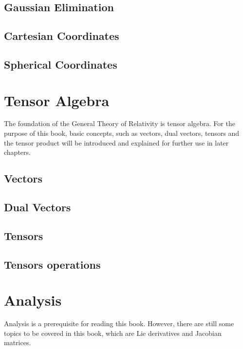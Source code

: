 \subsection{Gaussian Elimination}
\label{subsec:gaussian-elimination}

\subsection{Cartesian Coordinates}
\label{subsec:cartesian}

\subsection{Spherical Coordinates}
\label{subsec:spherical-coordinates}

\section{Tensor Algebra}
\label{sec:tensor-algebra}

The foundation of the General Theory of Relativity is tensor algebra.
For the purpose of this book, basic concepts, such as vectors, dual vectors, tensors and the tensor product will be introduced and explained for further 
use in later chapters.

\subsection{Vectors}
\label{subsec:vectors}

\subsection{Dual Vectors}
\label{subsec:dual-vectors}

\subsection{Tensors}
\label{subsec:tensors}

\subsection{Tensors operations}
\label{subsec:tensor-operations}

\section{Analysis}
\label{sec:analysis}

Analysis is a prerequisite for reading this book. However, there are still
some topics to be covered in this book, which are Lie derivatives and 
Jacobian matrices. 

